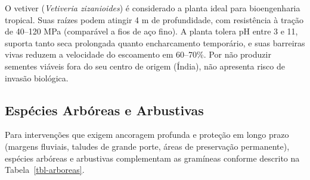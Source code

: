\documentclass[
  portuguese,
  11pt,
  a4paper,
  open=any]{scrbook}
\begin{document}
\begin{tcolorbox}[enhanced jigsaw, leftrule=.75mm, colframe=quarto-callout-tip-color-frame, colback=white, bottomrule=.15mm, opacityback=0, colbacktitle=quarto-callout-tip-color!10!white, breakable, bottomtitle=1mm, opacitybacktitle=0.6, title=\textcolor{quarto-callout-tip-color}{\faLightbulb}\hspace{0.5em}{Destaque: Vetiver}, titlerule=0mm, toprule=.15mm, toptitle=1mm, rightrule=.15mm, left=2mm, arc=.35mm, coltitle=black]

O vetiver (\emph{Vetiveria zizanioides}) é considerado a planta ideal
para bioengenharia tropical. Suas raízes podem atingir 4 m de
profundidade, com resistência à tração de 40--120 MPa (comparável a fios
de aço fino). A planta tolera pH entre 3 e 11, suporta tanto seca
prolongada quanto encharcamento temporário, e suas barreiras vivas
reduzem a velocidade do escoamento em 60--70\%. Por não produzir
sementes viáveis fora do seu centro de origem (Índia), não apresenta
risco de invasão biológica.

\end{tcolorbox}

\subsection{Espécies Arbóreas e
Arbustivas}\label{espuxe9cies-arbuxf3reas-e-arbustivas}

Para intervenções que exigem ancoragem profunda e proteção em longo
prazo (margens fluviais, taludes de grande porte, áreas de preservação
permanente), espécies arbóreas e arbustivas complementam as gramíneas
conforme descrito na Tabela~\ref{tbl-arboreas}.
\end{document}
